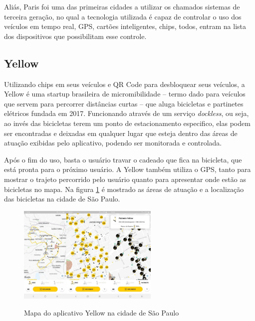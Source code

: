 Aliás, Paris foi uma das primeiras cidades a utilizar os chamados sistemas de terceira geração, no qual a tecnologia utilizada é capaz de controlar o uso dos veículos em tempo real, GPS, cartões inteligentes, chips, todos, entram na lista dos dispositivos que possibilitam esse controle.

\subsection{Yellow}

Utilizando chips em seus veículos e QR Code para desbloquear seus veículos, a Yellow é uma startup brasileira de micromibilidade -- termo dado para veículos que servem para percorrer distâncias curtas -- que aluga bicicletas e partinetes elétricos fundada em 2017. Funcionando através de um serviço \textit{dockless}, ou seja, ao invés das bicicletas terem um ponto de estacionamento especifico, elas podem ser encontradas e deixadas em qualquer lugar que esteja dentro das áreas de atuação exibidas pelo aplicativo, podendo ser monitorada e controlada. 

Após o fim do uso, basta o usuário travar o cadeado que fica na bicicleta, que está pronta para o próximo usuário. A Yellow também utiliza o GPS, tanto para mostrar o trajeto percorrido pelo usuário quanto para apresentar onde estão as bicicletas no mapa. Na figura \ref{fig:yellow-app} é mostrado as áreas de atuação e a localização das bicicletas na cidade de São Paulo.

\begin{figure}[!hbtp]
	\centering
	\caption{Mapa do aplicativo Yellow na cidade de São Paulo}
	\includegraphics[width=0.6\textwidth]{./04-figuras/yellow/yellow.png}
	\label{fig:yellow-app}
\end{figure}

